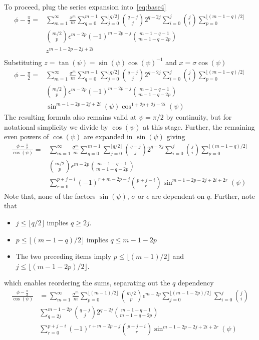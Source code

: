 \documentclass[a4paper]{amsart}
\begin{document}
To proceed, plug the series expansion into~\eqref{eq:base4}
\begin{align*}
\phi-\tfrac{\pi}{2}=&\sum_{m=1}^\infty\frac{x^m}{m}\sum_{q=0}^{m-1}
%
\sum_{j=0}^{\lfloor q/2\rfloor}\binom{q-j}{j}2^{q-2j}\sum_{i=0}^j\binom{j}{i}\sum_{p=0}^{\lfloor (m-1-q)/2\rfloor}\\
%
&\binom{m/2}{p}\epsilon^{m-2p}(-1)^{m-2p-j}\binom{m-1-q-1}{m-1-q-2p}\\
&z^{m-1-2p-2j+2i}\\
\end{align*}
Substituting $z=\tan(\psi)=\sin(\psi)\cos(\psi)^{-1}$ and $x=\sigma\cos(\psi)$
\begin{align*}
\phi-\tfrac{\pi}{2}=&\sum_{m=1}^\infty\frac{\sigma^m}{m}\sum_{q=0}^{m-1}
%
\sum_{j=0}^{\lfloor q/2\rfloor}\binom{q-j}{j}2^{q-2j}\sum_{i=0}^j\binom{j}{i}\sum_{p=0}^{\lfloor (m-1-q)/2\rfloor}\\
%
&\binom{m/2}{p}\epsilon^{m-2p}(-1)^{m-2p-j}\binom{m-1-q-1}{m-1-q-2p}\\
&\sin^{m-1-2p-2j+2i}(\psi)\cos^{1+2p+2j-2i}(\psi)
\end{align*}
The resulting formula also remains valid at $\psi=\pi/2$ by continuity, but for notational simplicity we divide by $\cos(\psi)$ at this stage. Further, the remaining even powers of $\cos(\psi)$ are expanded in $\sin(\psi)$ giving
\begin{align*}
\frac{\phi-\tfrac{\pi}{2}}{\cos(\psi)}
=&\sum_{m=1}^\infty\frac{\sigma^m}{m}\sum_{q=0}^{m-1}
%
\sum_{j=0}^{\lfloor q/2\rfloor}\binom{q-j}{j}2^{q-2j}\sum_{i=0}^j\binom{j}{i}\sum_{p=0}^{\lfloor (m-1-q)/2\rfloor}\\
%
&\binom{m/2}{p}\epsilon^{m-2p}\binom{m-1-q-1}{m-1-q-2p}\\
&\sum_{r=0}^{p+j-i}(-1)^{r+m-2p-j}\binom{p+j-i}{r}\sin^{m-1-2p-2j+2i+2r}(\psi)
\end{align*}
Note that, none of the factors $\sin(\psi)$, $\sigma$ or $\epsilon$ are dependent on $q$. Further, note that
\begin{itemize}
\item $j\leq \lfloor q/2\rfloor$ implies $q\geq 2j$.
\item $p\leq \lfloor (m-1-q)/2\rfloor$ implies $q\leq m-1-2p$
\item The two preceding items imply $p\leq\lfloor (m-1)/2\rfloor$ and $j\leq\lfloor (m-1-2p)/2\rfloor$.
\end{itemize}
which enables reordering the sums, separating out the $q$ dependency
\begin{align*}
\frac{\phi-\tfrac{\pi}{2}}{\cos(\psi)}&=\sum_{m=1}^\infty\frac{\sigma^m}{m}
%
\sum_{p=0}^{\lfloor (m-1)/2\rfloor}\binom{m/2}{p}\epsilon^{m-2p}\sum_{j=0}^{\lfloor (m-1-2p)/2\rfloor}\sum_{i=0}^j\binom{j}{i}\\
%
&\sum_{q=2j}^{m-1-2p}\binom{q-j}{j}2^{q-2j}
\binom{m-1-q-1}{m-1-q-2p}\\
&\sum_{r=0}^{p+j-i}(-1)^{r+m-2p-j}\binom{p+j-i}{r}\sin^{m-1-2p-2j+2i+2r}(\psi)
\end{align*}
\end{document}
